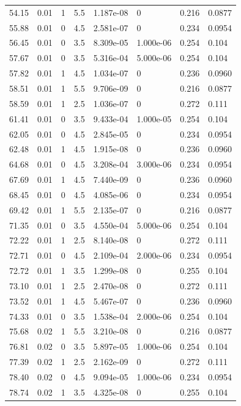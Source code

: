 \documentclass[preview]{standalone}
\begin{document}
{{{\begin{tabular}{L{1.2cm}C{1.2cm} C{0.3cm}C{0.5cm} C{1.4cm}C{1.4cm} C{1.4cm}C{1.4cm}}
  54.15  &  0.01  & 1     & 5.5 &  1.187e-08  & 0  & 0.216 &  0.0877   \\ 
  55.88  &  0.01  & 0     & 4.5 &  2.581e-07  & 0  & 0.234 &  0.0954   \\ 
  56.45  &  0.01  & 0     & 3.5 &  8.309e-05  & 1.000e-06  & 0.254 &  0.104   \\ 
  57.67  &  0.01  & 0     & 3.5 &  5.316e-04  & 5.000e-06  & 0.254 &  0.104   \\ 
  57.82  &  0.01  & 1     & 4.5 &  1.034e-07  & 0  & 0.236 &  0.0960   \\ 
  58.51  &  0.01  & 1     & 5.5 &  9.706e-09  & 0  & 0.216 &  0.0877   \\ 
  58.59  &  0.01  & 1     & 2.5 &  1.036e-07  & 0  & 0.272 &  0.111   \\ 
  61.41  &  0.01  & 0     & 3.5 &  9.433e-04  & 1.000e-05  & 0.254 &  0.104   \\ 
  62.05  &  0.01  & 0     & 4.5 &  2.845e-05  & 0  & 0.234 &  0.0954   \\ 
  62.48  &  0.01  & 1     & 4.5 &  1.915e-08  & 0  & 0.236 &  0.0960   \\ 
  64.68  &  0.01  & 0     & 4.5 &  3.208e-04  & 3.000e-06  & 0.234 &  0.0954   \\ 
  67.69  &  0.01  & 1     & 4.5 &  7.440e-09  & 0  & 0.236 &  0.0960   \\ 
  68.45  &  0.01  & 0     & 4.5 &  4.085e-06  & 0  & 0.234 &  0.0954   \\ 
  69.42  &  0.01  & 1     & 5.5 &  2.135e-07  & 0  & 0.216 &  0.0877   \\ 
  71.35  &  0.01  & 0     & 3.5 &  4.550e-04  & 5.000e-06  & 0.254 &  0.104   \\ 
  72.22  &  0.01  & 1     & 2.5 &  8.140e-08  & 0  & 0.272 &  0.111   \\ 
  72.71  &  0.01  & 0     & 4.5 &  2.109e-04  & 2.000e-06  & 0.234 &  0.0954   \\ 
  72.72  &  0.01  & 1     & 3.5 &  1.299e-08  & 0  & 0.255 &  0.104   \\ 
  73.10  &  0.01  & 1     & 2.5 &  2.470e-08  & 0  & 0.272 &  0.111   \\ 
  73.52  &  0.01  & 1     & 4.5 &  5.467e-07  & 0  & 0.236 &  0.0960   \\ 
  74.33  &  0.01  & 0     & 3.5 &  1.538e-04  & 2.000e-06  & 0.254 &  0.104   \\ 
  75.68  &  0.02  & 1     & 5.5 &  3.210e-08  & 0  & 0.216 &  0.0877   \\ 
  76.81  &  0.02  & 0     & 3.5 &  5.897e-05  & 1.000e-06  & 0.254 &  0.104   \\ 
  77.39  &  0.02  & 1     & 2.5 &  2.162e-09  & 0  & 0.272 &  0.111   \\ 
  78.40  &  0.02  & 0     & 4.5 &  9.094e-05  & 1.000e-06  & 0.234 &  0.0954   \\ 
  78.74  &  0.02  & 1     & 3.5 &  4.325e-08  & 0  & 0.255 &  0.104   \\ 
\hline 
\end{tabular} 

}}}
\end{document}
